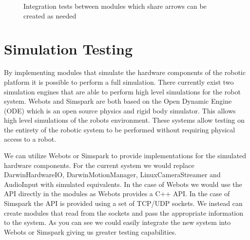 \documentclass[english,12pt]{scrartcl}
\begin{document}
\begin{figure}[!h]
{}
		\caption{Integration tests between modules which share arrows can be created as needed}
		\label{fig:links}
	\end{figure}
	
\section{Simulation Testing}
	By implementing modules that simulate the hardware components of the robotic platform it is possible to perform a full simulation.
	There currently exist two simulation engines that are able to perform high level simulations for the robot system.
	Webots and Simspark are both based on the Open Dynamic Engine (ODE) which is an open source physics and rigid body simulator.
	This allows high level simulations of the robots environment.
	These systems allow testing on the entirety of the robotic system to be performed without requiring physical access to a robot.
	
	We can utilize Webots or Simspark to provide implementations for the simulated hardware components.
	For the current system we would replace DarwinHardwareIO, DarwinMotionManager, LinuxCameraStreamer and AudioInput with simulated equivalents.
	In the case of Webots we would use the API directly in the modules as Webots provides a C++ API.
	In the case of Simspark the API is provided using a set of TCP/UDP sockets.
	We instead can create modules that read from the sockets and pass the appropriate information to the system.
	As you can see we could easily integrate the new system into Webots or Simspark giving us greater testing capabilities.
	
\end{document}
